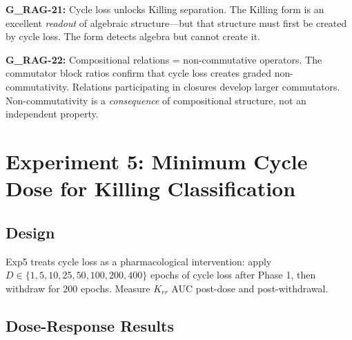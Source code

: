 \documentclass[11pt,letterpaper]{article}
\begin{document}
\textbf{G\_RAG-21:} Cycle loss unlocks Killing separation. The Killing form is an excellent \textit{readout} of algebraic structure---but that structure must first be created by cycle loss. The form detects algebra but cannot create it.

\textbf{G\_RAG-22:} Compositional relations = non-commutative operators. The commutator block ratios confirm that cycle loss creates graded non-commutativity. Relations participating in closures develop larger commutators. Non-commutativity is a \textit{consequence} of compositional structure, not an independent property.

\section{Experiment 5: Minimum Cycle Dose for Killing Classification}

\subsection{Design}

Exp5 treats cycle loss as a pharmacological intervention: apply $D \in \{1, 5, 10, 25, 50, 100, 200, 400\}$ epochs of cycle loss after Phase 1, then withdraw for 200 epochs. Measure $K_{rr}$ AUC post-dose and post-withdrawal.

\subsection{Dose-Response Results}
\end{document}
